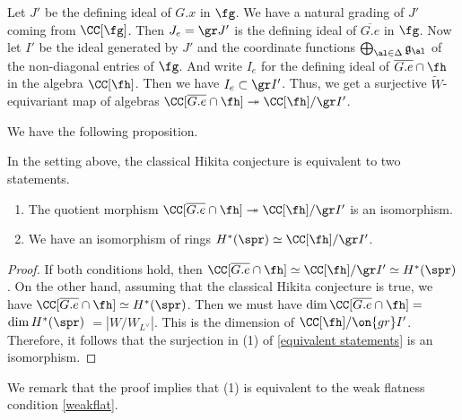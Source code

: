 \documentclass[12pt]{amsart}
\begin{document}
Let $J'$ be the defining ideal of $G.x$ in $\fg$. We have a natural grading of $J'$ coming from $\CC[\fg]$. Then $J_e= \gr J'$ is the defining ideal of $\overline{G.e}$ in $\fg$. Now let $I'$ be the ideal generated by $J'$ and the coordinate functions $\bigoplus_{\al \in \Delta} \mathfrak{g}_\al$ of the non-diagonal entries of $\fg$. And write $I_e$ for the defining ideal of $\overline{G.e}\cap \fh$ in the algebra $\CC[\fh]$. Then we have $I_e\subset \gr I'$. Thus, we get a surjective $\widetilde{W}$-equivariant map of algebras $\CC[\overline{G.e}\cap \fh] \twoheadrightarrow  \CC[\fh]/ \gr I'$.
 
We have the following proposition.
 \begin{prop}  \label{equivalent statements}
    In the setting above, the classical Hikita conjecture is equivalent to two statements.
 \begin{enumerate}
     \item The quotient morphism $\CC[\overline{G.e}\cap \fh] \twoheadrightarrow  \CC[\fh]/ \gr I'$ is an isomorphism. 
     \item We have an isomorphism of rings $H^*(\spr)\simeq \CC[\fh]/ \gr I'$.
 \end{enumerate}   
 \end{prop}
 
\begin{proof}
    If both conditions hold, then $\CC[\overline{G.e}\cap \fh]\simeq  \CC[\fh]/ \gr I'\simeq H^*(\spr)$. On the other hand, assuming that the classical Hikita conjecture is true, we have $\CC[\overline{G.e}\cap \fh]\simeq H^*(\spr)$. Then we must have $\dim \CC[\overline{G.e}\cap \fh]=$ $\dim H^*(\spr)$ $= |W/W_{L^\vee}|$. This is the dimension of $\CC[\fh]/\on{gr} I'$. Therefore, it follows that the surjection in (1) of \cref{equivalent statements} is an isomorphism.
\end{proof} 

We remark that the proof implies that (1) is equivalent to the weak flatness condition \ref{weakflat}.

\end{document}
